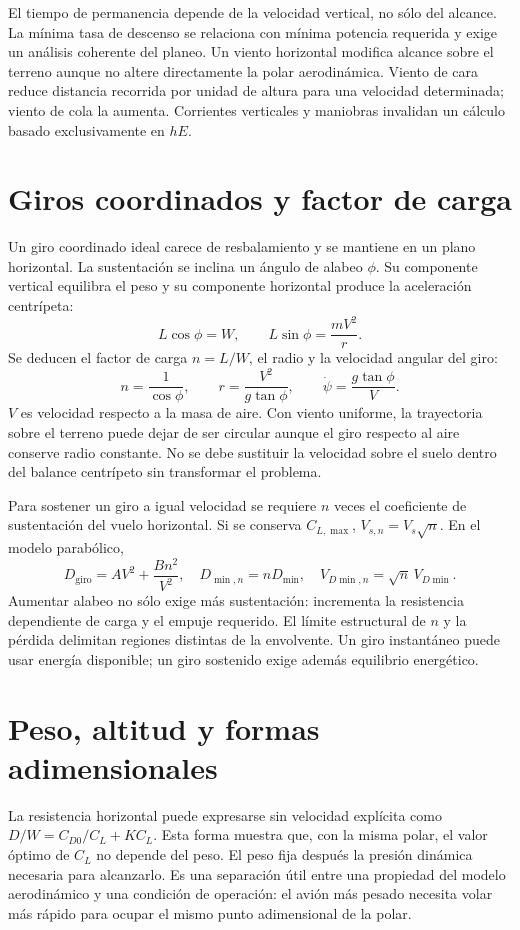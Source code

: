 El tiempo de permanencia depende de la velocidad vertical, no sólo del alcance. La mínima tasa de descenso se relaciona con mínima potencia requerida y exige un análisis coherente del planeo. Un viento horizontal modifica alcance sobre el terreno aunque no altere directamente la polar aerodinámica. Viento de cara reduce distancia recorrida por unidad de altura para una velocidad determinada; viento de cola la aumenta. Corrientes verticales y maniobras invalidan un cálculo basado exclusivamente en $hE$.

\section{Giros coordinados y factor de carga}
Un giro coordinado ideal carece de resbalamiento y se mantiene en un plano horizontal. La sustentación se inclina un ángulo de alabeo $\phi$. Su componente vertical equilibra el peso y su componente horizontal produce la aceleración centrípeta:
\begin{equation}
L\cos\phi=W,\qquad L\sin\phi=\frac{mV^2}{r}.
\end{equation}
Se deducen el factor de carga $n=L/W$, el radio y la velocidad angular del giro:
\begin{equation}\label{eq:11-turn}
n=\frac1{\cos\phi},\qquad r=\frac{V^2}{g\tan\phi},\qquad
\dot\psi=\frac{g\tan\phi}{V}.
\end{equation}
$V$ es velocidad respecto a la masa de aire. Con viento uniforme, la trayectoria sobre el terreno puede dejar de ser circular aunque el giro respecto al aire conserve radio constante. No se debe sustituir la velocidad sobre el suelo dentro del balance centrípeto sin transformar el problema.

Para sostener un giro a igual velocidad se requiere $n$ veces el coeficiente de sustentación del vuelo horizontal. Si se conserva $C_{L,\max}$, $V_{s,n}=V_s\sqrt n$. En el modelo parabólico,
\begin{equation}
D_{\mathrm{giro}}=AV^2+\frac{Bn^2}{V^2},\quad
D_{\min,n}=nD_{\min},\quad
V_{D\min,n}=\sqrt n\,V_{D\min}.
\end{equation}
Aumentar alabeo no sólo exige más sustentación: incrementa la resistencia dependiente de carga y el empuje requerido. El límite estructural de $n$ y la pérdida delimitan regiones distintas de la envolvente. Un giro instantáneo puede usar energía disponible; un giro sostenido exige además equilibrio energético.

\section{Peso, altitud y formas adimensionales}
La resistencia horizontal puede expresarse sin velocidad explícita como $D/W=C_{D0}/C_L+KC_L$. Esta forma muestra que, con la misma polar, el valor óptimo de $C_L$ no depende del peso. El peso fija después la presión dinámica necesaria para alcanzarlo. Es una separación útil entre una propiedad del modelo aerodinámico y una condición de operación: el avión más pesado necesita volar más rápido para ocupar el mismo punto adimensional de la polar.

